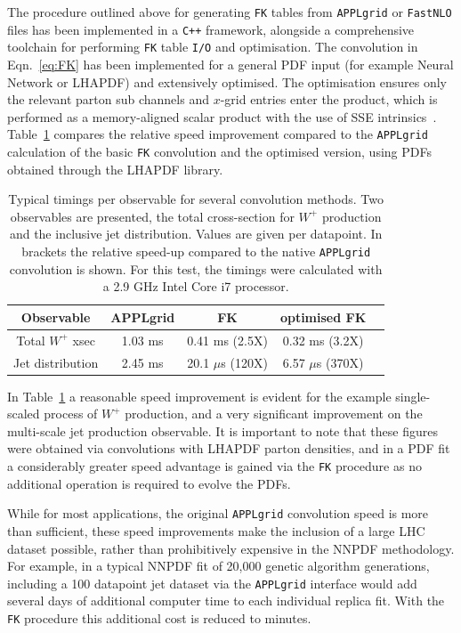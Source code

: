 The procedure outlined above for generating {\tt FK} tables from { \tt APPLgrid} or { \tt FastNLO} files has been implemented in a {\tt C++} framework, alongside a comprehensive toolchain for performing {\tt FK} table {\tt I/O} and optimisation. The convolution in Eqn.~\ref{eq:FK} has been implemented for a general PDF input (for example Neural Network or LHAPDF) and extensively optimised. The optimisation ensures only the relevant parton sub channels and $x$-grid entries enter the product, which is performed as a memory-aligned scalar product with the use of SSE intrinsics~\cite{SSE}.   Table~\ref{tab:FKtimings} compares the relative speed improvement compared to the { \tt APPLgrid} calculation of the basic  {\tt FK} convolution and the optimised version, using PDFs obtained through the LHAPDF library.
\begin{table}[htp]
\begin{center}
\begin{tabular}{|c|c|c|c|c|}
\hline Observable &APPLgrid & FK & optimised FK \\
\hline Total $W^+$ xsec &1.03 ms & 0.41 ms (2.5X) & 0.32 ms (3.2X) \\
\hline Jet distribution &2.45 ms & 20.1 $\mu$s (120X) & 6.57 $\mu$s (370X) \\ 
\hline
\end{tabular}
\caption[Comparison of { \tt APPLgrid} and {\tt FK} convolution timings]{Typical timings per observable for several convolution methods. Two observables are presented, the total cross-section for $W^+$ production and the inclusive jet \pt  distribution. Values are given per datapoint. In brackets the relative speed-up compared to the native { \tt APPLgrid} convolution is shown. For this test, the timings were calculated with a 2.9 GHz Intel Core i7 processor.}
\end{center}
\label{tab:FKtimings}
\end{table}
\clearpage
In Table~\ref{tab:FKtimings} a reasonable speed improvement is evident for the example single-scaled process of $W^+$ production, and a very significant improvement on the multi-scale jet production observable. It is important to note that these figures were obtained via convolutions with LHAPDF parton densities, and in a PDF fit a considerably greater speed advantage is gained via the {\tt FK} procedure as no additional operation is required to evolve the PDFs.

While for most applications, the original { \tt APPLgrid} convolution speed is more than sufficient, these speed improvements make the inclusion of a large LHC dataset possible, rather than prohibitively expensive in the NNPDF methodology. For example, in a typical NNPDF fit of 20,000 genetic algorithm generations, including a 100 datapoint jet dataset via the { \tt APPLgrid} interface would add several days of additional computer time to each individual replica fit. With the {\tt FK} procedure this additional cost is reduced to minutes.

